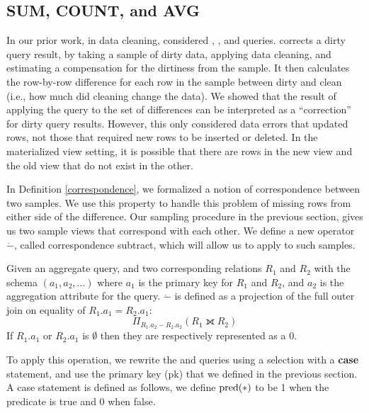 \subsection{SUM, COUNT, and AVG}
In our prior work, in data cleaning, \nsc considered \sumfunc, \countfunc, and \avgfunc queries.
\nsc corrects a dirty query result, by taking a sample of dirty data, applying data cleaning, and estimating a compensation for the dirtiness from the sample.
It then calculates the row-by-row difference for each row in the sample between dirty and clean (i.e., how much did cleaning change the data).
We showed that the result of applying the query to the set of differences can be interpreted as a ``correction'' for dirty query results. 
However, this only considered data errors that updated rows, not those that required new rows to be inserted or deleted.
In the materialized view setting, it is possible that there are rows in the new view and the old view that do not exist in the other.

In Definition \ref{correspondence}, we formalized a notion of correspondence between two samples.
We use this property to handle this problem of missing rows from either side of the difference.
Our sampling procedure in the previous section, gives us two sample views that correspond with each other.
We define a new operator $\dot{-}$, called correspondence subtract, which will allow us to apply \nsc to such samples.
\begin{definition} Given an aggregate query, and two corresponding relations $R_1$ and $R_2$ with the schema $(a_1, a_2, ...)$ where $a_1$ is the primary key for $R_1$ and $R_2$, and $a_2$ is the aggregation attribute for the query. 
$\dot{-}$ is defined as a projection of the full outer join on equality of $R_1.a_1 = R_2.a_1$: \[ \Pi_{R_1.a_2 - R_2.a_2} ( R_1 \fullouterjoin R_2 ) \]
If $R_1.a_1$ or $R_2.a_1$ is $\emptyset$ then they are respectively represented as a $0$.
\end{definition}
To apply this operation, we rewrite the \sumfunc and \countfunc queries using a selection with a \textbf{case} statement, and use the primary key (pk) that we defined in the previous section.
A case statement is defined as follows, we define $\textrm{pred}(*)$ to be 1 when the predicate is true and 0 when false.

